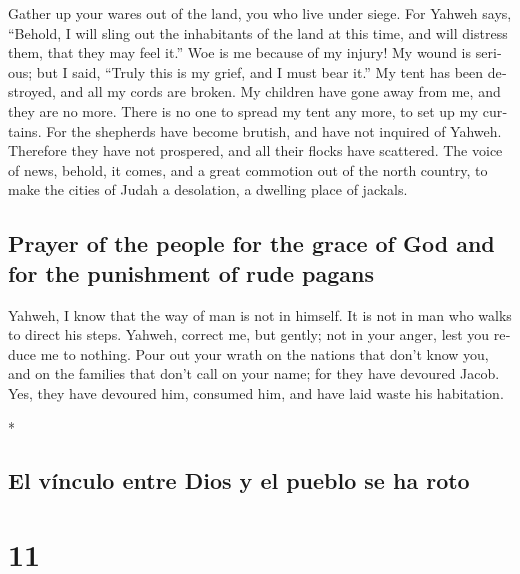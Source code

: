 \begin{paracol}{2}
\begin{otherlanguage}{english}
 Gather up your wares out of the land, you who live under
siege.  For Yahweh says, ``Behold, I will sling out the
inhabitants of the land at this time, and will distress them, that they
may feel it.''  Woe is me because of my injury! My wound
is serious; but I said, ``Truly this is my grief, and I must bear it.''
 My tent has been destroyed, and all my cords are broken.
My children have gone away from me, and they are no more. There is no
one to spread my tent any more, to set up my curtains. 
For the shepherds have become brutish, and have not inquired of Yahweh.
Therefore they have not prospered, and all their flocks have scattered.
 The voice of news, behold, it comes, and a great
commotion out of the north country, to make the cities of Judah a
desolation, a dwelling place of jackals.

\hypertarget{prayer-of-the-people-for-the-grace-of-god-and-for-the-punishment-of-rude-pagans}{%
\subsection{Prayer of the people for the grace of God and for the
punishment of rude
pagans}\label{prayer-of-the-people-for-the-grace-of-god-and-for-the-punishment-of-rude-pagans}}

 Yahweh, I know that the way of man is not in himself. It
is not in man who walks to direct his steps.  Yahweh,
correct me, but gently; not in your anger, lest you reduce me to
nothing.  Pour out your wrath on the nations that don't
know you, and on the families that don't call on your name; for they
have devoured Jacob. Yes, they have devoured him, consumed him, and have
laid waste his habitation.

\end{otherlanguage}

\switchcolumn[0]*

\hypertarget{el-vuxednculo-entre-dios-y-el-pueblo-se-ha-roto}{%
\subsection{El vínculo entre Dios y el pueblo se ha
roto}\label{el-vuxednculo-entre-dios-y-el-pueblo-se-ha-roto}}

\hypertarget{section-20}{%
\section{11}\label{section-20}}


\end{paracol}
